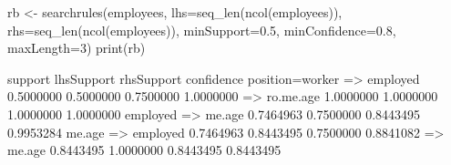 \begin{Schunk}
% --begin: "searchrules"
\begin{Sinput}
 rb <- searchrules(employees,
                   lhs=seq_len(ncol(employees)),
                   rhs=seq_len(ncol(employees)),
                   minSupport=0.5,
                   minConfidence=0.8,
                   maxLength=3)
 print(rb)
\end{Sinput}
\begin{Soutput}
                              support lhsSupport rhsSupport confidence
position=worker => employed 0.5000000  0.5000000  0.7500000  1.0000000
 => ro.me.age               1.0000000  1.0000000  1.0000000  1.0000000
employed => me.age          0.7464963  0.7500000  0.8443495  0.9953284
me.age => employed          0.7464963  0.8443495  0.7500000  0.8841082
 => me.age                  0.8443495  1.0000000  0.8443495  0.8443495
\end{Soutput}
%
% --end: "searchrules"
\end{Schunk}
